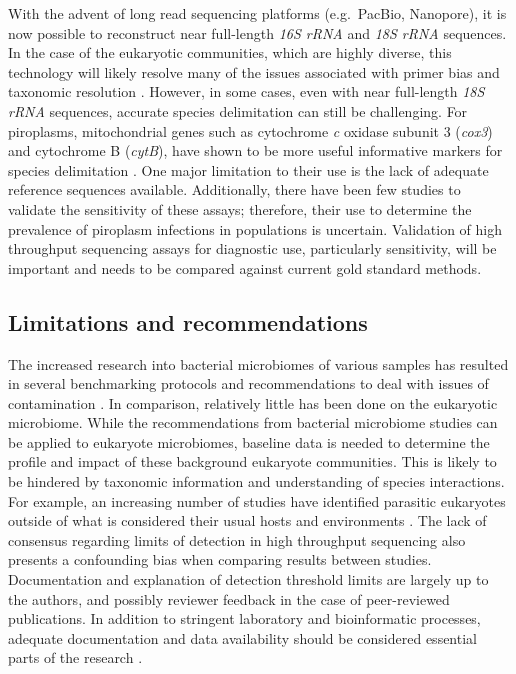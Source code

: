 \documentclass[a4paper, nobind]{templates/ociamthesis}
\begin{document}
With the advent of long read sequencing platforms (e.g.~PacBio, Nanopore), it is now possible to reconstruct near full-length \emph{16S rRNA} and \emph{18S rRNA} sequences.
In the case of the eukaryotic communities, which are highly diverse, this technology will likely resolve many of the issues associated with primer bias and taxonomic resolution \autocite{jamyLongReadMetabarcoding2020}.
However, in some cases, even with near full-length \emph{18S rRNA} sequences, accurate species delimitation can still be challenging.
For piroplasms, mitochondrial genes such as cytochrome \emph{c} oxidase subunit 3 (\emph{cox3}) and cytochrome B (\emph{cytB}), have shown to be more useful informative markers for species delimitation \autocite{schreegMitochondrialGenomeSequences2016,barbosaSequenceAnalysesMitochondrial2019}.
One major limitation to their use is the lack of adequate reference sequences available.
Additionally, there have been few studies to validate the sensitivity of these assays; therefore, their use to determine the prevalence of piroplasm infections in populations is uncertain.
Validation of high throughput sequencing assays for diagnostic use, particularly sensitivity, will be important and needs to be compared against current gold standard methods.

\hypertarget{limitations-and-recommendations-1}{%
\subsection{Limitations and recommendations}\label{limitations-and-recommendations-1}}

The increased research into bacterial microbiomes of various samples has resulted in several benchmarking protocols and recommendations to deal with issues of contamination \autocite{salterReagentLaboratoryContamination2014,eisenhoferContaminationLowMicrobial2019,hoffmannAnalysisTickSurface2020}.
In comparison, relatively little has been done on the eukaryotic microbiome.
While the recommendations from bacterial microbiome studies can be applied to eukaryote microbiomes, baseline data is needed to determine the profile and impact of these background eukaryote communities.
This is likely to be hindered by taxonomic information and understanding of species interactions.
For example, an increasing number of studies have identified parasitic eukaryotes outside of what is considered their usual hosts and environments \autocite{liDetectionHumanIntestinal2020}.
The lack of consensus regarding limits of detection in high throughput sequencing also presents a confounding bias when comparing results between studies.
Documentation and explanation of detection threshold limits are largely up to the authors, and possibly reviewer feedback in the case of peer-reviewed publications.
In addition to stringent laboratory and bioinformatic processes, adequate documentation and data availability should be considered essential parts of the research \autocite{kumuthiniTenSimpleRules2020}.
\end{document}

